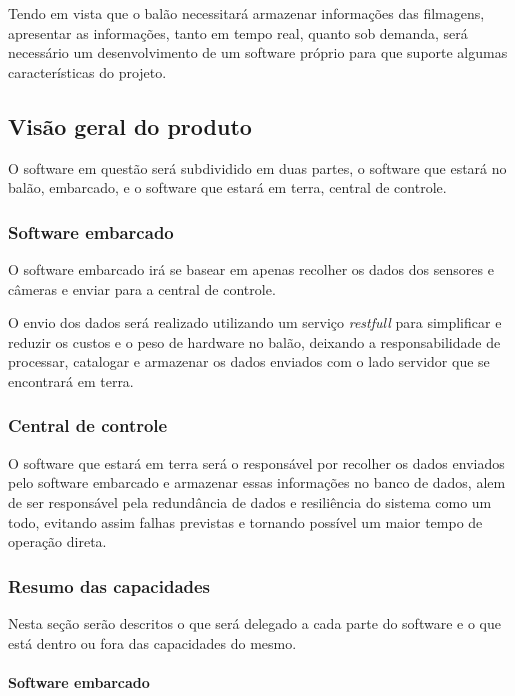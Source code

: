 Tendo em vista que o balão necessitará armazenar informações das filmagens, apresentar as informações, tanto em tempo real, quanto sob demanda, será necessário um desenvolvimento de um software próprio para que suporte algumas características do projeto.

\subsection{Visão geral do produto}

O software em questão será subdividido em duas partes, o software que estará no balão, embarcado, e o software que estará em terra, central de controle.

\subsubsection{Software embarcado}

O software embarcado irá se basear em apenas recolher os dados dos sensores e câmeras e enviar para a central de controle.

O envio dos dados será realizado utilizando um serviço \textit{restfull} para simplificar e reduzir os custos e o peso de hardware no balão, deixando a responsabilidade de processar, catalogar e armazenar os dados enviados com o lado servidor que se encontrará em terra.

\subsubsection{Central de controle}

O software que estará em terra será o responsável por recolher os dados enviados pelo software embarcado e armazenar essas informações no banco de dados, alem de ser responsável pela redundância de dados e resiliência do sistema como um todo, evitando assim falhas previstas e tornando possível um maior tempo de operação direta.

\subsubsection{Resumo das capacidades}

Nesta seção serão descritos o que será delegado a cada parte do software e o que está dentro ou fora das capacidades do mesmo.

\paragraph{Software embarcado}

